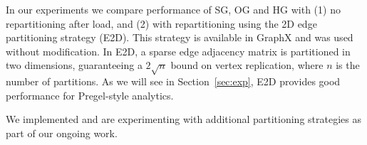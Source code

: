 In our experiments we compare performance of SG, OG and HG with (1) no
repartitioning after load, and (2) with repartitioning using the 2D
edge partitioning strategy (E2D).  This strategy is available in
GraphX and was used without modification.  In E2D, a sparse edge
adjacency matrix is partitioned in two dimensions, guaranteeing a $2
\sqrt{n}$ bound on vertex replication, where $n$ is the number of
partitions. As we will see in Section~\ref{sec:exp}, E2D provides good
performance for Pregel-style analytics.

We implemented and are experimenting with additional partitioning
strategies as part of our ongoing work.
